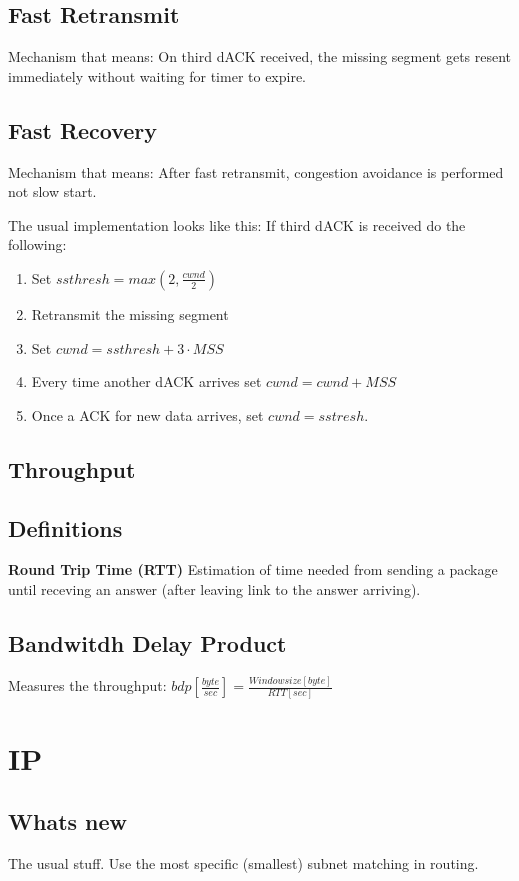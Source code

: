 \documentclass{article}
\begin{document}
\subsection{Fast Retransmit}
Mechanism that means: On third dACK received, the missing segment gets resent immediately without waiting for timer to expire.

\subsection{Fast Recovery}
Mechanism that means: After fast retransmit, congestion avoidance is performed not slow start.

The usual implementation looks like this: If third dACK is received do the following:

\begin{enumerate}
     \item Set $ssthresh = max(2, \frac{cwnd}{2})$
     \item Retransmit the missing segment
     \item Set $cwnd = ssthresh + 3 \cdot MSS$
     \item Every time another dACK arrives set $cwnd = cwnd + MSS$
     \item Once a ACK for new data arrives, set $cwnd = sstresh$.
\end{enumerate}

\subsection{Throughput}
\subsection{Definitions}

\textbf{Round Trip Time (RTT)}
Estimation of time needed from sending a package until receving an answer (after leaving link to the answer arriving).

\subsection{Bandwitdh Delay Product}
Measures the throughput: $bdp [\frac{byte}{sec}] = \frac{Windowsize [byte]}{RTT [sec]}$

\section{IP}
\subsection{Whats new}
The usual stuff. Use the most specific (smallest) subnet matching in routing.
\end{document}
